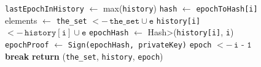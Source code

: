 \begin{figure}[t!]
\begin{adjustbox}{minipage=[t]{\columnwidth}}
\begin{algorithm}[H]
\begin{algorithmic}[1]
            		\State \texttt{lastEpochInHistory} $\leftarrow$ max(\texttt{history})
            			\State \texttt{hash} $\leftarrow$  \texttt{epochToHash[i]}
                			\State elements $\leftarrow$ 
									\State \texttt{the\_set} \(<- \, \texttt{the\_set} \cup \texttt{e}\)
									\State  \texttt{history[i]} \(<- \, \texttt{history}[\texttt{i}] \cup \texttt{e}\)
                    	 		\EndIf
                    	 	\EndFor
                    	    \State \texttt{epochHash} $\leftarrow$ \<Hash>(\texttt{history[i]}, \texttt{i})
                			\State \texttt{epochProof} $\leftarrow$  \texttt{Sign(\texttt{epochHash}, privateKey)}
               			\State {}
               		 \Else
						\State \texttt{epoch} \(<- \, \texttt{i - 1}\)
               		 	\State \textbf{break}
                    	\EndIf
                	\EndFor
            		\State \textbf{return} (\texttt{the\_set}, \texttt{history}, \texttt{epoch}) 
            	\EndFunction

        \end{algorithmic}
      \end{algorithm}
	\end{adjustbox}
  \end{figure}
  
